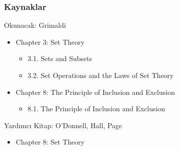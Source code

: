 \documentclass[dvipsnames]{beamer}
\theoremstyle{definition}
\theoremstyle{example}
\theoremstyle{plain}
\begin{document}
\begin{frame}
  \frametitle{Kaynaklar}

  \begin{block}{Okunacak: Grimaldi}
    \begin{itemize}
      \item Chapter 3: Set Theory
      \begin{itemize}
        \item 3.1. \alert{Sets and Subsets}
        \item 3.2. \alert{Set Operations and the Laws of Set Theory}
      \end{itemize}

      \item Chapter 8: The Principle of Inclusion and Exclusion
      \begin{itemize}
        \item 8.1. \alert{The Principle of Inclusion and Exclusion}
      \end{itemize}
    \end{itemize}
  \end{block}

  \begin{block}{Yardımcı Kitap: O'Donnell, Hall, Page}
    \begin{itemize}
      \item Chapter 8: Set Theory
    \end{itemize}
  \end{block}
\end{frame}
\end{document}
